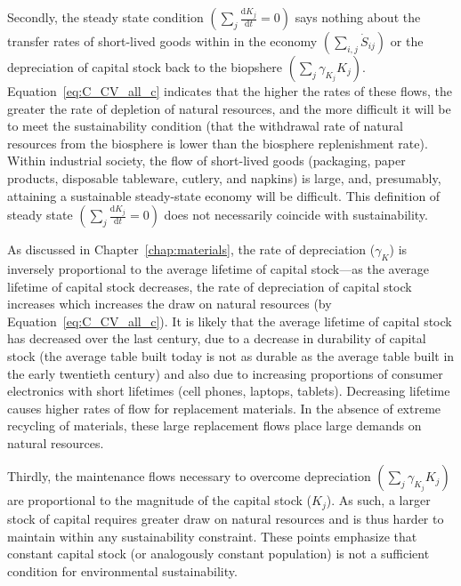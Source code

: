 Secondly,
the steady state condition 
$\left(\sum_{j}\frac{\mathrm{d}K_{j}}{\mathrm{d}t}=0\right)$
says nothing about the transfer rates of short-lived goods 
within in the economy $\left(\sum_{i,j}\dot{S}_{ij}\right)$
or the depreciation of capital stock back to the biopshere
$\left(\sum_{j}\gamma_{K_{j}}K_{j}\right)$.
Equation~\ref{eq:C_CV_all_c} indicates that 
the higher the rates of these flows,
the greater the rate of depletion of
natural resources, and the more difficult it will be to
meet the sustainability condition 
(that the withdrawal rate of natural resources from the biosphere
is lower than the biosphere
replenishment rate).
Within industrial society,
the flow of short-lived goods 
(packaging,
paper products,
disposable tableware,
cutlery,
and napkins)
is large,
and, presumably, attaining a sustainable steady-state economy
will be difficult.
This definition of steady state 
$\left(\sum_{j}\frac{\mathrm{d}K_{j}}{\mathrm{d}t}=0\right)$
does not necessarily coincide with sustainability.

As discussed in Chapter~\ref{chap:materials},
the rate of depreciation ($\gamma_{K}$) is inversely
proportional to the average lifetime of capital stock---as
the average lifetime of capital stock decreases,
the rate of depreciation of capital stock increases which
increases the draw on natural resources (by Equation~\ref{eq:C_CV_all_c}).
It is likely that the average lifetime of capital stock has
decreased over the last century, 
due to a decrease in durability of capital stock
(the average table built today is not as durable as the average table
built in the early twentieth century)
and also due to increasing proportions of consumer electronics
with short lifetimes (cell phones, laptops, tablets).
Decreasing lifetime causes higher rates of flow for
replacement materials.
In the absence of extreme recycling of materials,
these large replacement flows place large demands on
natural resources.

Thirdly,
the maintenance flows necessary to overcome
depreciation
$\left(\sum_{j}\gamma_{K_{j}}K_{j}\right)$
are proportional to the magnitude of the capital
stock ($K_{j}$).
As such,
a larger stock of capital requires
greater draw on natural resources and is thus harder
to maintain within any sustainability constraint.
These points emphasize that constant capital stock
(or analogously constant population)
is not a sufficient condition for environmental sustainability.


